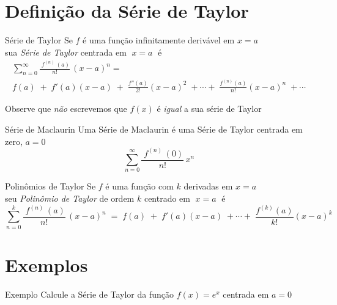 \documentclass[fleqn,utf8,aspectratio=169,12pt]{beamer}
\begin{document}
\section{Definição da Série de Taylor}

\begin{frame}{Série de Taylor}
  Se $f$ é uma função infinitamente derivável em \(x=a\) \\
  sua \emph{Série de Taylor} centrada em $\;x=a\;$ é
  \begin{multline*}
    \sum_{n=0}^\infty \frac{\;f^{(n)\;}(a)}{n!}\,(x-a)^n = \\
    f(a)\;+\;f'(a)(x-a)\;+\;\frac{f''(a)}{2!}(x-a)^2\;+\cdots+\;\frac{f^{(n)}(a)}{n!}(x-a)^n\;+\cdots
  \end{multline*}

  \pause
  \vspace{\baselineskip}
  Observe que \emph{não} escrevemos que $f(x)$ é \emph{igual} a sua série de Taylor
\end{frame}

\begin{frame}{Série de Maclaurin}
  Uma Série de Maclaurin é uma Série de Taylor centrada em zero, $a=0$
  \[
    \sum_{n=0}^\infty \frac{\;f^{(n)\;}(0)}{n!}\,x^n
  \]
\end{frame}

\begin{frame}{Polinômios de Taylor}
  Se $f$ é uma função com $k$ derivadas em \(x=a\) \\
  seu \emph{Polinômio de Taylor} de ordem $k$ centrado em $\;x=a\;$ é
  \[
    \sum_{n=0}^k \frac{\;f^{(n)\;}(a)}{n!}\,(x-a)^n
      \;=\; f(a)
      \;+\;f'(a)(x-a)
      \;+\cdots+\; \frac{f^{(k)}(a)}{k!}(x-a)^k
    \]
\end{frame}

\section{Exemplos}

\addtocounter{exemplo}{1}
\begin{frame}{Exemplo \theexemplo}
  Calcule a Série de Taylor da função \emph{$f(x)=e^x$} centrada em \emph{$a=0$}
\end{frame}
\end{document}
